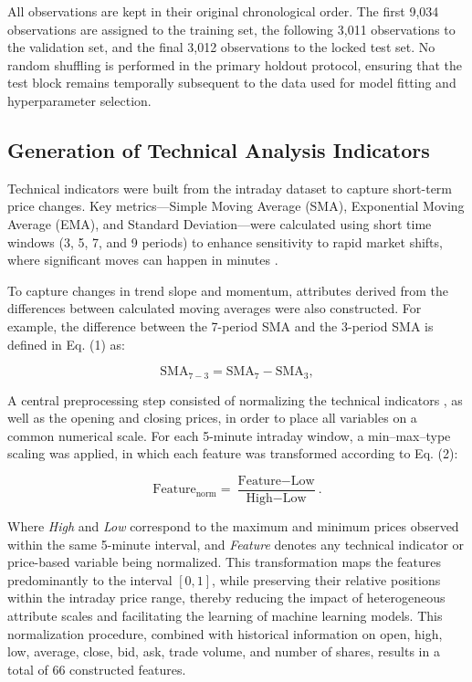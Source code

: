 All observations are kept in their original chronological order. The first 9,034 observations are assigned to the training set, the following 3,011 observations to the validation set, and the final 3,012 observations to the locked test set. No random shuffling is performed in the primary holdout protocol, ensuring that the test block remains temporally subsequent to the data used for model fitting and hyperparameter selection.

\subsection{Generation of Technical Analysis Indicators}
\label{sec:indicators}

Technical indicators were built from the intraday dataset to capture short-term price changes. Key metrics—Simple Moving Average (SMA), Exponential Moving Average (EMA), and Standard Deviation—were calculated using short time windows (3, 5, 7, and 9 periods) to enhance sensitivity to rapid market shifts, where significant moves can happen in minutes \cite{hunter1986exponentially}.

To capture changes in trend slope and momentum, attributes derived from the differences between calculated moving averages were also constructed. For example, the difference between the 7-period SMA and the 3-period SMA is defined in Eq. (1) as:

\begin{equation}
\text{SMA}_{7-3} = \text{SMA}_{7} - \text{SMA}_{3},
\end{equation}

A central preprocessing step consisted of normalizing the technical indicators \cite{singh2022feature}, as well as the opening and closing prices, in order to place all variables on a common numerical scale. For each 5-minute intraday window, a min–max–type scaling was applied, in which each feature was transformed according to Eq. (2):

\begin{equation}
\text{Feature}_{\text{norm}} = \frac{\text{Feature} - \text{Low}}{\text{High} - \text{Low}}.
\end{equation}

Where \textit{High} and \textit{Low} correspond to the maximum and minimum prices observed within the same 5-minute interval, and \textit{Feature} denotes any technical indicator or price-based variable being normalized. This transformation maps the features predominantly to the interval $[0,1]$, while preserving their relative positions within the intraday price range, thereby reducing the impact of heterogeneous attribute scales and facilitating the learning of machine learning models. This normalization procedure, combined with historical information on open, high, low, average, close, bid, ask, trade volume, and number of shares, results in a total of 66 constructed features.

